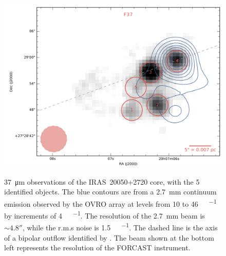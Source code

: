 \begin{figure}
\begin{center}
\includegraphics[width=\textwidth]{Figures/IRAS20050_core.png}
\label{fig:IRAS20050_core}

\caption{\SI{37}{\um} observations of the IRAS~20050+2720 core, with the 5 identified objects. The blue contours are from a \SI{2.7}{\milli\meter} continuum emission observed by the OVRO array \citep{Beltran:2008gu} at levels from 10 to \SI{46}{\milli\Jy\per\beam} by increments of \SI{4}{\milli\Jy\per\beam}. The resolution of the \SI{2.7}{\milli\meter} beam is $\sim\ang{;;4.8}$, while the r.m.s noise is \SI{1.5}{\milli\Jy\per\beam}. The dashed line is the axis of a bipolar outflow identified by \citet{Bachiller:1995cy}. The beam shown at the bottom left represents the resolution of the FORCAST instrument.}
\end{center}
\end{figure}

